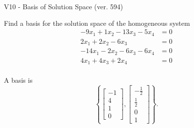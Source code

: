 \begin{exercise}
  \begin{exerciseTitle}V10 - Basis of Solution Space (ver. 594)\end{exerciseTitle}
  \begin{exerciseStatement}
    Find a basis for the solution space of the homogeneous system 
\begin{align*}
 -9 x_ 1 + 1 x_ 2 -13 x_ 3 -5 x_ 4 &= 0  \\ 
  2 x_ 1 + 2 x_ 2 -6 x_ 3 &= 0  \\ 
  -14 x_ 1 -2 x_ 2 -6 x_ 3 -6 x_ 4 &= 0  \\ 
  4 x_ 1 + 4 x_ 3 + 2 x_ 4 &= 0  \\ 
 \end{align*}


 
  \end{exerciseStatement}

  \begin{exerciseAnswer}
   A basis is   
\[\left\{\left[\begin{array}{c}
-1 \\
4 \\
1 \\
0
\end{array}\right] , \left[\begin{array}{c}
-\frac{1}{2} \\
\frac{1}{2} \\
0 \\
1
\end{array}\right]\right\}.\]

  


  \end{exerciseAnswer}
\end{exercise}